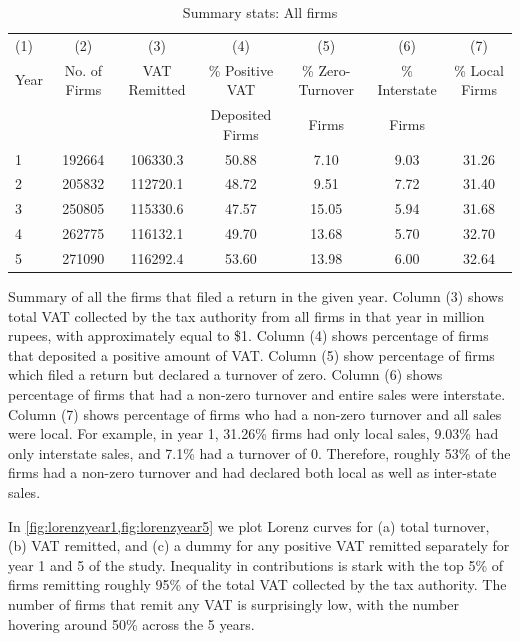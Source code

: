\begin{table}[h]
\footnotesize
\begin{threeparttable}
\begin{tabular}{lcccccc}\\ 
\hline \hline
(1)&(2)&(3)&(4)&(5)&(6)&(7)\\
Year & No. of Firms & VAT Remitted & \% Positive VAT  & \% Zero-Turnover  & \% Interstate & \% Local Firms \\  
& & & Deposited Firms & Firms &Firms & \\ \hline
1&192664& 106330.3 &50.88&7.10&9.03&31.26 \\
2&205832&112720.1&48.72&9.51&7.72&31.40 \\
3&250805&115330.6&47.57&15.05&5.94&31.68 \\
4&262775&116132.1&49.70&13.68&5.70&32.70 \\
5&271090&116292.4 &53.60&13.98&6.00&32.64 \\ \hline \hline
\end{tabular} 
\begin{tablenotes}
\scriptsize
Summary of all the firms that filed a return in the given year. Column (3) shows total VAT collected by the tax authority from all firms in that year in million rupees, with  approximately equal to \$1. Column (4) shows percentage of firms that deposited a positive amount of VAT. Column (5) show percentage of firms which filed a return but declared a turnover of zero. Column (6) shows percentage of firms that had a non-zero turnover and entire sales were interstate. Column (7) shows percentage of firms who had a non-zero turnover and all sales were local. For example, in year 1, 31.26\% firms had only local sales, 9.03\% had only interstate sales, and 7.1\% had a turnover of 0. Therefore, roughly 53\% of the firms had a non-zero turnover and had declared both local as well as inter-state sales.
\end{tablenotes}
\caption{Summary stats: All firms}
\label{tbl:all-summary}
\end{threeparttable}
\end{table}

In \cref{fig:lorenzyear1,fig:lorenzyear5} we plot Lorenz curves for (a) total turnover, (b) VAT remitted, and (c) a dummy for any positive VAT remitted separately for year 1 and 5 of the study. Inequality in contributions is stark with the top 5\% of firms remitting roughly 95\% of the total VAT collected by the tax authority. The number of firms that remit any VAT is surprisingly low, with the number hovering around 50\% across the 5 years.

